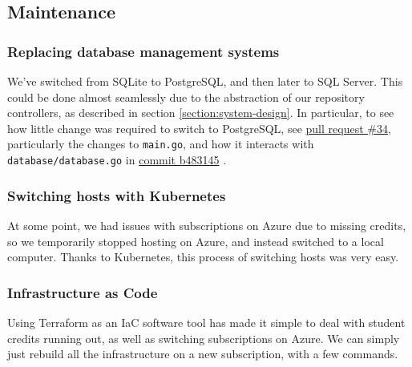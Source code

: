 \subsection{Maintenance}

\subsubsection{Replacing database management systems}

We've switched from SQLite to PostgreSQL, and then later to SQL Server. This could be done almost seamlessly due to the abstraction of our repository controllers, as described in section \ref{section:system-design}.
In particular, to see how little change was required to switch to PostgreSQL, see \href{https://github.com/Devops-2022-Group-R/itu-minitwit/pull/34}{pull request \#34}, particularly the changes to \texttt{main.go}, and how it interacts with \texttt{database/database.go} in \href{https://github.com/Devops-2022-Group-R/itu-minitwit/pull/34/commits/b4831458ae940e9b4c42dd929fe9be73143580d4#diff-9e185f29fa355d7dd8fdd9c9ff1d0723b85206aa7d37c4eec93997005dc291eb}{commit b483145} \cite{commit:switching-to-psql}.


\subsubsection{Switching hosts with Kubernetes}

At some point, we had issues with subscriptions on Azure due to missing credits, so we temporarily stopped hosting on Azure, and instead switched to a local computer. Thanks to Kubernetes, this process of switching hosts was very easy.


\subsubsection{Infrastructure as Code}

Using Terraform as an IaC software tool has made it simple to deal with student credits running out, as well as switching subscriptions on Azure. We can simply just rebuild all the infrastructure on a new subscription, with a few commands.
